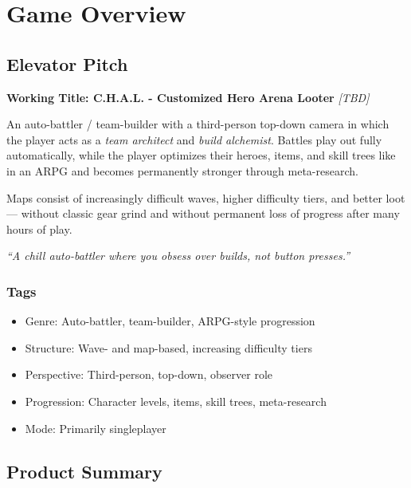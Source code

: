 \section{Game Overview}
\label{sec:game-overview}

\subsection{Elevator Pitch}

\textbf{Working Title: C.H.A.L. - Customized Hero Arena Looter} \emph{[TBD]} %

An auto-battler / team-builder with a third-person top-down camera in which the player acts as a \emph{team architect} and \emph{build alchemist}. Battles play out fully automatically, while the player optimizes their heroes, items, and skill trees like in an ARPG and becomes permanently stronger through meta-research.

Maps consist of increasingly difficult waves, higher difficulty tiers, and better loot — without classic gear grind and without permanent loss of progress after many hours of play.
\\
\begin{center}
	\textit{“A chill auto-battler where you obsess over builds, not button presses.”}
\end{center}

\subsubsection*{Tags}

\begin{itemize}
	\item Genre: Auto-battler, team-builder, ARPG-style progression
	\item Structure: Wave- and map-based, increasing difficulty tiers
	\item Perspective: Third-person, top-down, observer role
	\item Progression: Character levels, items, skill trees, meta-research
	\item Mode: Primarily singleplayer %
\end{itemize}

\subsection{Product Summary}

